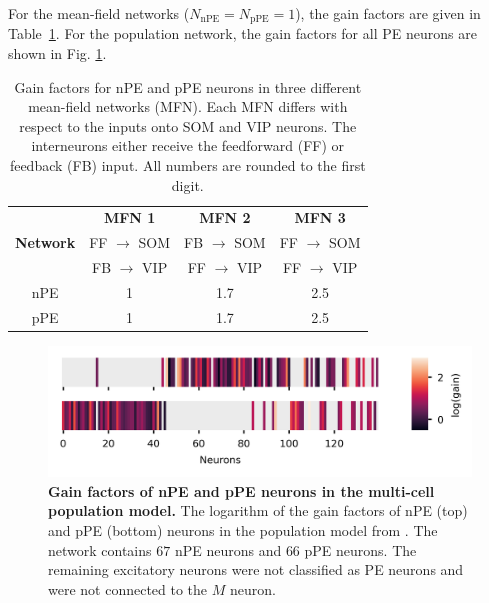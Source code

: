 \documentclass[10pt,a4paper]{article}
\providecommand{\DIFaddtex}[1]{{\protect\color{blue}\uwave{#1}}} %
\providecommand{\DIFaddbegin}{} %
\providecommand{\DIFaddend}{} %
\providecommand{\DIFaddFL}[1]{\DIFadd{#1}} %
\providecommand{\DIFaddbeginFL}{} %
\providecommand{\DIFaddendFL}{} %
\providecommand{\DIFdelbeginFL}{} %
\providecommand{\DIFdelendFL}{} %
\providecommand{\DIFadd}[1]{\texorpdfstring{\DIFaddtex{#1}}{#1}} %
\newcommand{\DIFscaledelfig}{0.5}
\newlength{\DIFdelgraphicswidth} %
\newlength{\DIFdelgraphicsheight} %
\newcommand{\DIFaddincludegraphics}[2][]{{\color{blue}\fbox{\DIFOincludegraphics[#1]{#2}}}} %
\newcommand{\DIFdelincludegraphics}[2][]{%
\sbox{\DIFdelgraphicsbox}{\DIFOincludegraphics[#1]{#2}}%
\settoboxwidth{\DIFdelgraphicswidth}{\DIFdelgraphicsbox} %
\settoboxtotalheight{\DIFdelgraphicsheight}{\DIFdelgraphicsbox} %
\scalebox{\DIFscaledelfig}{%
\parbox[b]{\DIFdelgraphicswidth}{\usebox{\DIFdelgraphicsbox}\\[-\baselineskip] \rule{\DIFdelgraphicswidth}{0em}}\llap{\resizebox{\DIFdelgraphicswidth}{\DIFdelgraphicsheight}{%
\setlength{\unitlength}{\DIFdelgraphicswidth}%
\begin{picture}(1,1)%
\thicklines\linethickness{2pt} %
{\color[rgb]{1,0,0}\put(0,0){\framebox(1,1){}}}%
{\color[rgb]{1,0,0}\put(0,0){\line( 1,1){1}}}%
{\color[rgb]{1,0,0}\put(0,1){\line(1,-1){1}}}%
\end{picture}%
}\hspace*{3pt}}} %
} %
\DeclareRobustCommand{\DIFaddbegin}{\DIFOaddbegin \let\includegraphics\DIFaddincludegraphics} %
\DeclareRobustCommand{\DIFaddend}{\DIFOaddend \let\includegraphics\DIFOincludegraphics} %
\DeclareRobustCommand{\DIFaddbeginFL}{\DIFOaddbeginFL \let\includegraphics\DIFaddincludegraphics} %
\DeclareRobustCommand{\DIFaddendFL}{\DIFOaddendFL \let\includegraphics\DIFOincludegraphics} %
\DeclareRobustCommand{\DIFdelbeginFL}{\DIFOdelbeginFL \let\includegraphics\DIFdelincludegraphics} %
\DeclareRobustCommand{\DIFdelendFL}{\DIFOaddendFL \let\includegraphics\DIFOincludegraphics} %
\begin{document}
For the mean-field networks ($ N_\mathrm{nPE} = N_\mathrm{pPE} = 1 $), the gain factors \DIFaddbegin \DIFadd{$g_\mathrm{nPE}$ and $g_\mathrm{pPE}$ }\DIFaddend are given in Table~\ref{tab:gain_factors_MFN}. For the population network, the gain factors for all PE neurons are shown in Fig. \ref{fig:Fig_gains}. 
%
\begin{table}[h!]
\centering
\begin{tabular}{ |c|c|c|c| }
\hline
 & \textbf{MFN 1} & \textbf{MFN 2} & \textbf{MFN 3}  \\
\textbf{Network} & FF $\rightarrow$ SOM  & FB $\rightarrow$ SOM  & FF $\rightarrow$ SOM  \\
 & FB $\rightarrow$ VIP  & FF $\rightarrow$ VIP  & FF $\rightarrow$ VIP  \\
\hline
\hline
nPE & 1 & 1.7 & 2.5\\
pPE & 1 & 1.7 & 2.5 \\
\hline
\end{tabular}
\caption{\footnotesize{Gain factors for nPE and pPE neurons in three different mean-field networks (MFN). Each MFN differs with respect to the inputs onto SOM and VIP neurons. The interneurons either receive the feedforward (FF) or feedback (FB) input. All numbers are rounded to the first digit.}}
\label{tab:gain_factors_MFN}
\end{table}
%
%
\begin{figure}[h!]
	\centering
    \includegraphics{../results/figures/final/Figure_gains}
\caption{\DIFdelbeginFL %
\DIFdelendFL \DIFaddbeginFL \footnotesize{\bf Gain factors of nPE and pPE neurons in the multi-cell population model.\newline}
\DIFaddendFL {The logarithm of the gain factors of nPE (top) and pPE (bottom) neurons in the \DIFaddbeginFL \DIFaddFL{multi-cell }\DIFaddendFL population model from \citep{hertag2022prediction}. The network contains $67$ nPE neurons and $66$ pPE neurons. The remaining excitatory neurons were not classified as PE neurons and were not connected to the $M$ neuron.}}
\label{fig:Fig_gains}
\end{figure}
%
%
\end{document}
